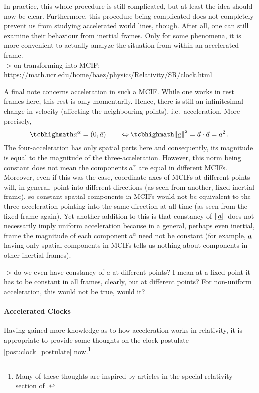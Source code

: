 \documentclass[../relativity_main.tex]{subfiles}
\begin{document}
In practice, this whole procedure is still complicated, but at least the idea should now be clear. Furthermore, this procedure being complicated does not completely prevent us from studying accelerated world lines, though. After all, one can still examine their behaviour from inertial frames. Only for some phenomena, it is more convenient to actually analyze the situation from within an accelerated frame.\\


-> on transforming into MCIF: \url{https://math.ucr.edu/home/baez/physics/Relativity/SR/clock.html}


A final note concerns acceleration in such a MCIF. While one works in rest frames here, this rest is only momentarily. Hence, there is still an infinitesimal change in velocity (affecting the neighbouring points), i.e.~acceleration. More precisely,
\begin{equation}\label{eq:four_acceleration_mcif}
	\eqbox{
	a^\alpha = (0, \vec{a})
	} \qquad \Leftrightarrow
	\eqbox{
	\norm{\fvec{a}}^2 = \vec{a} \cdot \vec{a} = a^2
	} \, .
\end{equation}
The four-acceleration has only spatial parts here and consequently, its magnitude is equal to the magnitude of the three-acceleration. However, this norm being constant does not mean the components $a^\alpha$ are equal in different MCIFs. Moreover, even if this was the case, coordinate axes of MCIFs at different points will, in general, point into different directions (as seen from another, fixed inertial frame), so constant spatial components in MCIFs would not be equivalent to the three-acceleration pointing into the same direction at all time (as seen from the fixed frame again). Yet another addition to this is that constancy of $\norm{\underline{a}}$ does not necessarily imply uniform acceleration because in a general, perhaps even inertial, frame the magnitude of each component $a^\alpha$ need not be constant (for example, $\underline{a}$ having only spatial components in MCIFs tells us nothing about components in other inertial frames).

-> do we even have constancy of $a$ at different points? I mean at a fixed point it has to be constant in all frames, clearly, but at different points? For non-uniform acceleration, this would not be true, would it?



			\paragraph{Accelerated Clocks}
Having gained more knowledge as to how acceleration works in relativity, it is appropriate to provide some thoughts on the clock postulate \ref{post:clock_postulate} now.\footnote{Many of these thoughts are inspired by articles in the special relativity section of \cite{baez_physics_page}.}
\end{document}
